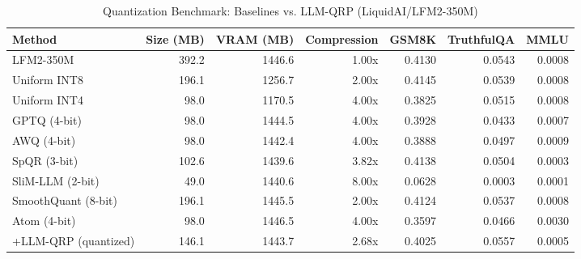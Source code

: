 \begin{table}[htbp]
  \centering
  \small
  \caption{Quantization Benchmark: Baselines vs. LLM-QRP (LiquidAI/LFM2-350M)}
  \label{tab:benchmark}
  \begin{tabular}{lrrrrrr}
    \toprule
    \textbf{Method} & \textbf{Size (MB)} & \textbf{VRAM (MB)} & \textbf{Compression} & \textbf{GSM8K} & \textbf{TruthfulQA} & \textbf{MMLU} \\
    \midrule
    LFM2-350M & 392.2 & 1446.6 & 1.00x & 0.4130 & 0.0543 & 0.0008 \\
    Uniform INT8 & 196.1 & 1256.7 & 2.00x & 0.4145 & 0.0539 & 0.0008 \\
    Uniform INT4 & 98.0 & 1170.5 & 4.00x & 0.3825 & 0.0515 & 0.0008 \\
    GPTQ (4-bit) & 98.0 & 1444.5 & 4.00x & 0.3928 & 0.0433 & 0.0007 \\
    AWQ (4-bit) & 98.0 & 1442.4 & 4.00x & 0.3888 & 0.0497 & 0.0009 \\
    SpQR (3-bit) & 102.6 & 1439.6 & 3.82x & 0.4138 & 0.0504 & 0.0003 \\
    SliM-LLM (2-bit) & 49.0 & 1440.6 & 8.00x & 0.0628 & 0.0003 & 0.0001 \\
    SmoothQuant (8-bit) & 196.1 & 1445.5 & 2.00x & 0.4124 & 0.0537 & 0.0008 \\
    Atom (4-bit) & 98.0 & 1446.5 & 4.00x & 0.3597 & 0.0466 & 0.0030 \\
    \midrule
    +LLM-QRP (quantized) & 146.1 & 1443.7 & 2.68x & 0.4025 & 0.0557 & 0.0005 \\
    \bottomrule
  \end{tabular}
\end{table}
